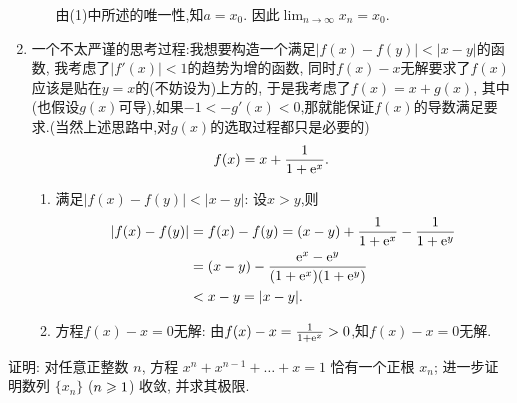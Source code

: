 \begin{solution}
\begin{enumerate}
\begin{enumerate}
                        由(1)中所述的唯一性,知$a = x_0$. 因此$\lim_{n \to \infty} x_n = x_0$.
              \end{enumerate}
        \item 一个不太严谨的思考过程:我想要构造一个满足$|f(x)-f(y)| < |x-y|$的函数, 我考虑了$|f'(x)|<1$的趋势为增的函数, 同时$f(x)-x$无解要求了$f(x)$应该是贴在$y=x$的(不妨设为)上方的, 于是我考虑了$f(x) = x + g(x)$, 其中(也假设$g(x)$可导),如果$-1 < -g'(x) < 0$,那就能保证$f(x)$的导数满足要求.(当然上述思路中,对$g(x)$的选取过程都只是必要的)
              $$f(x) = x + \frac{1}{1 + \mathrm{e}^{x}}.$$
              \begin{enumerate}
                  \item 满足$|f(x)-f(y)| < |x-y|$:
                        设$x > y$,则
                        \begin{align*}
                            |f(x)-f(y)| & = f(x)-f(y) = (x-y) + \frac{1}{1+\mathrm{e}^x} - \frac{1}{1+\mathrm{e}^y} \\
                                        & = (x-y) - \frac{\mathrm{e}^x - \mathrm{e}^y}{(1+\mathrm{e}^x)(1+\mathrm{e}^y)}            \\
                                        & < x-y = |x-y|.
                        \end{align*}
                  \item 方程$f(x)-x=0$无解:
                        由$f(x)-x = \frac{1}{1+\mathrm{e}^x} > 0$,知$f(x)-x=0$无解.
              \end{enumerate}
    \end{enumerate}
\end{solution}

\begin{exercise}[2.C.9]
    证明: 对任意正整数 $n$, 方程 $x^n+x^{n-1}+\dots+x=1$ 恰有一个正根 $x_n$; 进一步证明数列 $\{x_n\}$ ($n \geqslant 1$) 收敛, 并求其极限.
\end{exercise}

